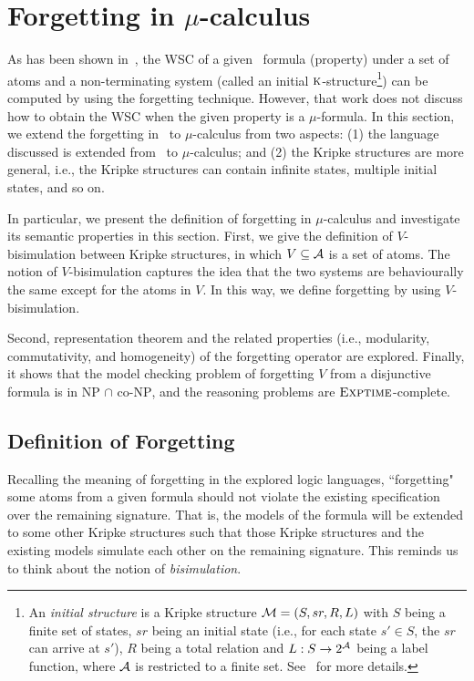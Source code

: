 \documentclass[runningheads]{llncs}
\begin{document}
\section{Forgetting in $\mu$-calculus} \label{forgetting}
As has been shown in~\cite{renyansfirstpaper}, the WSC of a given \CTL\ formula (property) under a set of atoms and a non-terminating system (called an initial $\textsc{k}$-structure\footnote{An \emph{initial structure} is a Kripke structure ${\cal M}=(S, sr, R, L)$ with $S$ being a finite set of states, $sr$ being an initial state (i.e., for each state $s'\in S$, the $sr$ can arrive at $s'$), $R$ being a total relation and $L: S \rightarrow 2^{{\cal A}}$ being a label function, where ${\cal A}$ is restricted to a finite set. See~\cite{feng2020sufficient} for more details.}) can be computed by using the forgetting technique.
However, that work does not discuss how to obtain the WSC when the given property is a $\mu$-formula.
In this section, we extend the forgetting in \CTL\ to $\mu$-calculus from two aspects: (1) the language discussed is extended from \CTL\ to $\mu$-calculus; and
(2) the Kripke structures are more general, i.e., the Kripke structures can contain infinite states, multiple initial states, and so on.

In particular, we present the definition of forgetting in $\mu$-calculus and investigate its semantic properties in this section.
First, we give the definition of $V$-bisimulation between Kripke structures, in which $V \subseteq {\cal A}$ is a set of atoms. The notion of $V$-bisimulation captures the idea that the two systems are behaviourally the same except for the atoms in $V$. In this way, we define forgetting by using $V$-bisimulation.

Second, representation theorem and the related properties (i.e., modularity, commutativity, and homogeneity) of the forgetting operator are explored.
Finally, it shows that the model checking problem of forgetting $V$ from a disjunctive formula is in \textsc{NP} $\cap$ co-\textsc{NP}, and the reasoning problems are $\textsc{Exptime}$-complete.

\subsection{Definition of Forgetting}
Recalling the meaning of forgetting in the explored logic languages, ``forgetting" some atoms from  a given formula should not violate the existing specification over the remaining signature.
That is, the models of the formula will be extended to some other Kripke structures such that those Kripke structures and the existing models simulate each other on the remaining signature.
This reminds us to think about the notion of \emph{bisimulation}.
\end{document}
